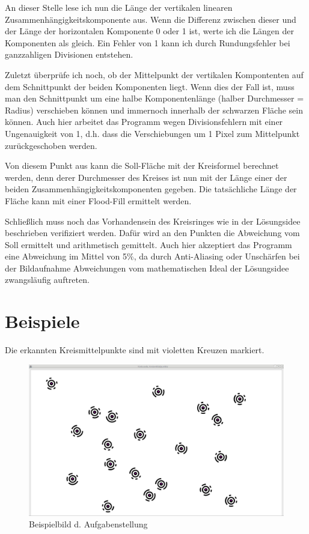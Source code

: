 An dieser Stelle lese ich nun die Länge der vertikalen linearen Zusammenhängigkeitskomponente aus. Wenn die Differenz zwischen dieser und der Länge der horizontalen Komponente 0 oder 1 ist, werte ich die Längen der Komponenten als gleich. Ein Fehler von 1 kann ich durch Rundungsfehler bei ganzzahligen Divisionen entstehen.

Zuletzt überprüfe ich noch, ob der Mittelpunkt der vertikalen Kompontenten auf dem Schnittpunkt der beiden Komponenten liegt. Wenn dies der Fall ist, muss man den Schnittpunkt um eine halbe Komponentenlänge (halber Durchmesser = Radius) verschieben können und immernoch innerhalb der schwarzen Fläche sein können. Auch hier arbeitet das Programm wegen Divisionsfehlern mit einer Ungenauigkeit von 1, d.h. dass die Verschiebungen um 1 Pixel zum Mittelpunkt zurückgeschoben werden.

Von diesem Punkt aus kann die Soll-Fläche mit der Kreisformel berechnet werden, denn derer Durchmesser des Kreises ist nun mit der Länge einer der beiden Zusammenhängigkeitskomponenten gegeben. Die tatsächliche Länge der Fläche kann mit einer Flood-Fill ermittelt werden.

Schließlich muss noch das Vorhandensein des Kreisringes wie in der Lösungsidee beschrieben verifiziert werden. Dafür wird an den Punkten die Abweichung vom Soll ermittelt und arithmetisch gemittelt. Auch hier akzeptiert das Programm eine Abweichung im Mittel von 5\%, da durch Anti-Aliasing oder Unschärfen bei der Bildaufnahme Abweichungen vom mathematischen Ideal der Lösungsidee zwangsläufig auftreten.
\pagebreak
\section{Beispiele}
Die erkannten Kreismittelpunkte sind mit violetten Kreuzen markiert.
\begin{figure}[!ht]
	\centering	
	\includegraphics[width=\textwidth]{sek1bsp1}
	\caption{Beispielbild d. Aufgabenstellung}
\end{figure}